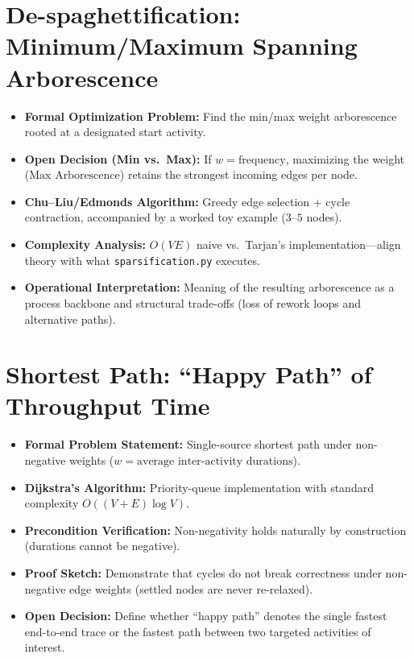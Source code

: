 \section{De-spaghettification: Minimum/Maximum Spanning Arborescence}
\begin{itemize}[leftmargin=*]
	\item \textbf{Formal Optimization Problem:} Find the min/max weight arborescence rooted at a designated start activity.
	\item \textbf{Open Decision (Min vs.\ Max):} If $w = \text{frequency}$, maximizing the weight ($\text{Max Arborescence}$) retains the strongest incoming edges per node.
	\item \textbf{Chu--Liu/Edmonds Algorithm:} Greedy edge selection + cycle contraction, accompanied by a worked toy example ($3\text{--}5$ nodes).
	\item \textbf{Complexity Analysis:} $O(VE)$ naive vs.\ Tarjan's implementation—align theory with what \texttt{sparsification.py} executes.
	\item \textbf{Operational Interpretation:} Meaning of the resulting arborescence as a process backbone and structural trade-offs (loss of rework loops and alternative paths).
\end{itemize}

\section{Shortest Path: ``Happy Path'' of Throughput Time}
\begin{itemize}[leftmargin=*]
	\item \textbf{Formal Problem Statement:} Single-source shortest path under non-negative weights ($w = \text{average inter-activity durations}$).
	\item \textbf{Dijkstra's Algorithm:} Priority-queue implementation with standard complexity $O((V + E) \log V)$.
	\item \textbf{Precondition Verification:} Non-negativity holds naturally by construction (durations cannot be negative).
	\item \textbf{Proof Sketch:} Demonstrate that cycles do not break correctness under non-negative edge weights (settled nodes are never re-relaxed).
	\item \textbf{Open Decision:} Define whether ``happy path'' denotes the single fastest end-to-end trace or the fastest path between two targeted activities of interest.
\end{itemize}

